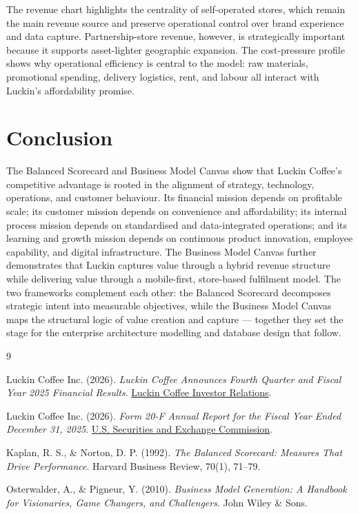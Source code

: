 \documentclass[12pt,a4paper]{article}
\begin{document}
The revenue chart highlights the centrality of self-operated stores, which remain the main revenue source and preserve operational control over brand experience and data capture. Partnership-store revenue, however, is strategically important because it supports asset-lighter geographic expansion. The cost-pressure profile shows why operational efficiency is central to the model: raw materials, promotional spending, delivery logistics, rent, and labour all interact with Luckin's affordability promise.

\section{Conclusion}

The Balanced Scorecard and Business Model Canvas show that Luckin Coffee's competitive advantage is rooted in the alignment of strategy, technology, operations, and customer behaviour. Its financial mission depends on profitable scale; its customer mission depends on convenience and affordability; its internal process mission depends on standardised and data-integrated operations; and its learning and growth mission depends on continuous product innovation, employee capability, and digital infrastructure. The Business Model Canvas further demonstrates that Luckin captures value through a hybrid revenue structure while delivering value through a mobile-first, store-based fulfilment model. The two frameworks complement each other: the Balanced Scorecard decomposes strategic intent into measurable objectives, while the Business Model Canvas maps the structural logic of value creation and capture — together they set the stage for the enterprise architecture modelling and database design that follow.

\begingroup
\small
\setlength{\itemsep}{0pt}
\begin{thebibliography}{9}

Luckin Coffee Inc. (2026).
\emph{Luckin Coffee Announces Fourth Quarter and Fiscal Year 2025 Financial Results}.
\href{https://investor.luckincoffee.com/news-releases/news-release-details/luckin-coffee-announces-fourth-quarter-and-fiscal-year-2025/}{Luckin Coffee Investor Relations}.

Luckin Coffee Inc. (2026).
\emph{Form 20-F Annual Report for the Fiscal Year Ended December 31, 2025}.
\href{https://www.sec.gov/Archives/edgar/data/1767582/000110465926035712/lk-20251231x20f.htm}{U.S. Securities and Exchange Commission}.

Kaplan, R. S., \& Norton, D. P. (1992).
\emph{The Balanced Scorecard: Measures That Drive Performance}.
Harvard Business Review, 70(1), 71--79.

Osterwalder, A., \& Pigneur, Y. (2010).
\emph{Business Model Generation: A Handbook for Visionaries, Game Changers, and Challengers}.
John Wiley \& Sons.

\end{thebibliography}
\endgroup
\end{document}
